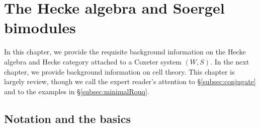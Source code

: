 \section{The Hecke algebra and Soergel bimodules}
\label{sec:heckeandsbim}







In this chapter, we provide the requisite background information on the Hecke algebra and Hecke category attached to a Coxeter system $(W,S)$. In the next chapter, we provide background information on cell theory. This chapter is largely review, though we call the expert reader's attention to \S\ref{subsec:conjugate} and to the examples in \S\ref{subsec:minimalRouq}.




\subsection{Notation and the basics}
\label{subsec:notation}


